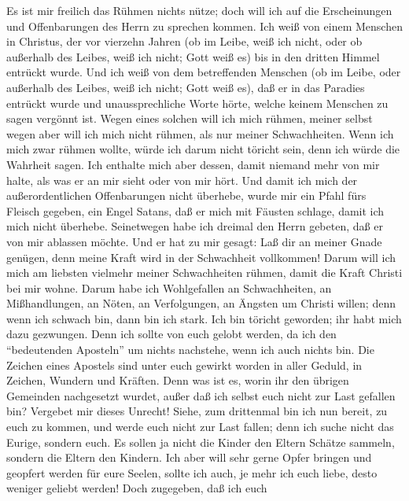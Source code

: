  Es ist mir freilich das Rühmen nichts nütze; doch will
ich auf die Erscheinungen und Offenbarungen des Herrn zu sprechen
kommen.  Ich weiß von einem Menschen in Christus, der vor
vierzehn Jahren (ob im Leibe, weiß ich nicht, oder ob außerhalb des
Leibes, weiß ich nicht; Gott weiß es) bis in den dritten Himmel entrückt
wurde.  Und ich weiß von dem betreffenden Menschen (ob im
Leibe, oder außerhalb des Leibes, weiß ich nicht; Gott weiß es),
 daß er in das Paradies entrückt wurde und
unaussprechliche Worte hörte, welche keinem Menschen zu sagen vergönnt
ist.  Wegen eines solchen will ich mich rühmen, meiner
selbst wegen aber will ich mich nicht rühmen, als nur meiner
Schwachheiten.  Wenn ich mich zwar rühmen wollte, würde
ich darum nicht töricht sein, denn ich würde die Wahrheit sagen. Ich
enthalte mich aber dessen, damit niemand mehr von mir halte, als was er
an mir sieht oder von mir hört.  Und damit ich mich der
außerordentlichen Offenbarungen nicht überhebe, wurde mir ein Pfahl fürs
Fleisch gegeben, ein Engel Satans, daß er mich mit Fäusten schlage,
damit ich mich nicht überhebe.  Seinetwegen habe ich
dreimal den Herrn gebeten, daß er von mir ablassen möchte.
 Und er hat zu mir gesagt: Laß dir an meiner Gnade
genügen, denn meine Kraft wird in der Schwachheit vollkommen! Darum will
ich mich am liebsten vielmehr meiner Schwachheiten rühmen, damit die
Kraft Christi bei mir wohne.  Darum habe ich Wohlgefallen
an Schwachheiten, an Mißhandlungen, an Nöten, an Verfolgungen, an
Ängsten um Christi willen; denn wenn ich schwach bin, dann bin ich
stark.  Ich bin töricht geworden; ihr habt mich dazu
gezwungen. Denn ich sollte von euch gelobt werden, da ich den
``bedeutenden Aposteln'' um nichts nachstehe, wenn ich auch nichts bin.
 Die Zeichen eines Apostels sind unter euch gewirkt
worden in aller Geduld, in Zeichen, Wundern und Kräften. 
Denn was ist es, worin ihr den übrigen Gemeinden nachgesetzt wurdet,
außer daß ich selbst euch nicht zur Last gefallen bin? Vergebet mir
dieses Unrecht!  Siehe, zum drittenmal bin ich nun
bereit, zu euch zu kommen, und werde euch nicht zur Last fallen; denn
ich suche nicht das Eurige, sondern euch. Es sollen ja nicht die Kinder
den Eltern Schätze sammeln, sondern die Eltern den Kindern.
 Ich aber will sehr gerne Opfer bringen und geopfert
werden für eure Seelen, sollte ich auch, je mehr ich euch liebe, desto
weniger geliebt werden!  Doch zugegeben, daß ich euch
